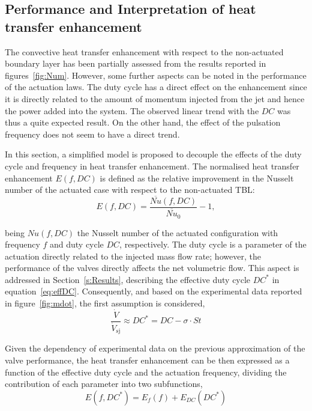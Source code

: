 \subsection{Performance and Interpretation of heat transfer enhancement}\label{s:enhanment_model}
%
The convective heat transfer enhancement with respect to the non-actuated boundary layer has been partially assessed from the results reported in figures~\ref{fig:Num}. However, some further aspects can be noted in the performance of the actuation laws. The duty cycle has a direct effect on the enhancement since it is directly related to the amount of momentum injected from the jet and hence the power added into the system. The observed linear trend with the $DC$ was thus a quite expected result. On the other hand, the effect of the pulsation frequency does not seem to have a direct trend.

In this section, a simplified model is proposed to decouple the effects of the duty cycle and frequency in heat transfer enhancement. The normalised heat transfer enhancement $E(f,DC)$ is defined as the relative improvement in the Nusselt number of the actuated case with respect to the non-actuated TBL:
%
\begin{equation}
    E(f,DC) = \frac{\overline{Nu}(f,DC)}{\overline{Nu}_0}-1,
    \label{eq:Edef}
\end{equation}

\noindent being $Nu(f,DC)$ the Nusselt number of the actuated configuration with frequency $f$ and duty cycle $DC$, respectively. The duty cycle is a parameter of the actuation directly related to the injected mass flow rate; however, the performance of the valves directly affects the net volumetric flow. This aspect is addressed in Section~\ref{s:Results}, describing the  effective duty cycle $DC^*$ in equation~\ref{eq:effDC}. Consequently, and based on the experimental data reported in figure~\ref{fig:mdot}, the first assumption is considered, 
%
\begin{equation}\label{eq:Q/Qst}
   \frac{\dot{V}}{\dot{V}_{\mathrm{sj}}} \approx DC^* = DC - \sigma \cdot St
\end{equation}

Given the dependency of experimental data on the previous approximation of the valve performance, the heat transfer enhancement can be then expressed as a function of the effective duty cycle and the actuation frequency, dividing the contribution of each parameter into two subfunctions,
\begin{equation}
    E(f,DC^*) = E_f(f) + E_{DC}(DC^*)
\end{equation}

